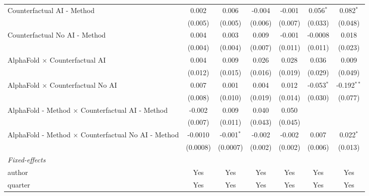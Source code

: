 \begin{tabular}{lcccccc}
   Counterfactual AI - Method                                 & 0.002          & 0.006        & -0.004  & -0.001  & 0.056$^{*}$  & 0.082$^{*}$\\   
                                                              & (0.005)        & (0.005)      & (0.006) & (0.007) & (0.033)      & (0.048)\\   
   Counterfactual No AI - Method                              & 0.004          & 0.003        & 0.009   & -0.001  & -0.0008      & 0.018\\   
                                                              & (0.004)        & (0.004)      & (0.007) & (0.011) & (0.011)      & (0.023)\\   
   AlphaFold $\times$ Counterfactual AI                       & 0.004          & 0.009        & 0.026   & 0.028   & 0.036        & 0.009\\   
                                                              & (0.012)        & (0.015)      & (0.016) & (0.019) & (0.029)      & (0.049)\\   
   AlphaFold $\times$ Counterfactual No AI                    & 0.007          & 0.001        & 0.004   & 0.012   & -0.053$^{*}$ & -0.192$^{**}$\\   
                                                              & (0.008)        & (0.010)      & (0.019) & (0.014) & (0.030)      & (0.077)\\   
   AlphaFold - Method $\times$ Counterfactual AI - Method     & -0.002         & 0.009        & 0.040   & 0.050   &              &   \\   
                                                              & (0.007)        & (0.011)      & (0.043) & (0.045) &              &   \\   
   AlphaFold - Method $\times$ Counterfactual No AI - Method  & -0.0010        & -0.001$^{*}$ & -0.002  & -0.002  & 0.007        & 0.022$^{*}$\\   
                                                              & (0.0008)       & (0.0007)     & (0.002) & (0.002) & (0.006)      & (0.013)\\   
   \midrule
   \emph{Fixed-effects}\\
   author                                                     & Yes            & Yes          & Yes     & Yes     & Yes          & Yes\\  
   quarter                                                    & Yes            & Yes          & Yes     & Yes     & Yes          & Yes\\  

\end{tabular}
